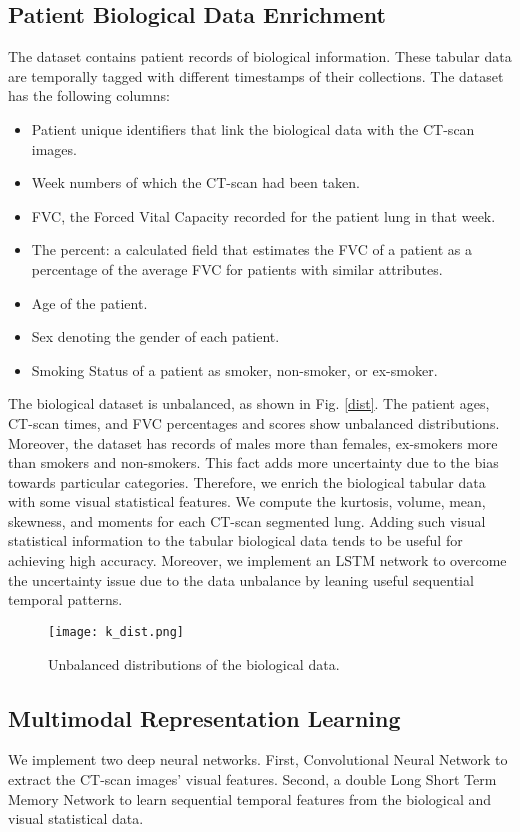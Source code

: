 \documentclass[conference]{IEEEtran}
\begin{document}
\subsection{Patient Biological Data Enrichment}
The dataset contains patient records of biological information. These tabular data are temporally tagged with different timestamps of their collections. The dataset has the following columns:
\begin{itemize}
    \item Patient unique identifiers that link the biological data with the CT-scan images.
    \item Week numbers of which the CT-scan had been taken.
    \item FVC, the Forced Vital Capacity recorded for the patient lung in that week.
    \item The percent: a calculated field that estimates the FVC of a patient as a percentage of the average FVC for patients with similar attributes.
    \item Age of the patient.
    \item Sex denoting the gender of each patient.
    \item Smoking Status of a patient as smoker, non-smoker, or ex-smoker.
\end{itemize}

The biological dataset is unbalanced, as shown in Fig. \ref{dist}. The patient ages, CT-scan times, and FVC percentages and scores show unbalanced distributions. Moreover, the dataset has records of males more than females, ex-smokers more than smokers and non-smokers. This fact adds more uncertainty due to the bias towards particular categories. Therefore, we enrich the biological tabular data with some visual statistical features. We compute the kurtosis, volume, mean, skewness, and moments for each CT-scan segmented lung. Adding such visual statistical information to the tabular biological data tends to be useful for achieving high accuracy. Moreover, we implement an LSTM network to overcome the uncertainty issue due to the data unbalance by leaning useful sequential temporal patterns. 

\begin{figure}\label{dist}
    \centering
    \texttt{[image: k\_dist.png]}
    \caption{Unbalanced distributions of the biological data.}
    \label{fig:imbalanced_nd}
\end{figure}

\subsection{Multimodal Representation Learning}
We implement two deep neural networks. First, Convolutional Neural Network to extract the CT-scan images' visual features. Second, a double Long Short Term Memory Network to learn sequential temporal features from the biological and visual statistical data. 
\end{document}
